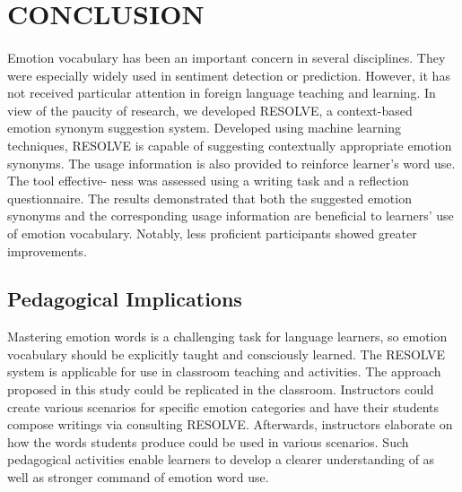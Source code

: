 \documentclass[a4paper,12pt,oneside]{article}
\begin{document}
\newpage
\section{CONCLUSION}
\paragraph{}
Emotion vocabulary has been an important concern in several disciplines. They were especially widely used in sentiment detection or prediction. However, it has not received particular attention in foreign language teaching and learning. In view of the paucity of research, we developed RESOLVE, a context-based emotion synonym suggestion system. Developed using machine learning techniques, RESOLVE is capable of suggesting contextually appropriate emotion synonyms. The usage information is also provided to reinforce learner’s word use. The tool effective- ness was assessed using a writing task and a reflection questionnaire. The results demonstrated that both the suggested emotion synonyms and the corresponding usage information are beneficial to learners’ use of emotion vocabulary. Notably, less proficient participants showed greater improvements.
\subsection{Pedagogical Implications}
Mastering emotion words is a challenging task for language learners, so emotion vocabulary should be explicitly taught and consciously learned. The RESOLVE system is applicable for use in classroom teaching and activities. The approach proposed in this study could be replicated in the classroom. Instructors could create various scenarios for specific emotion categories and have their students compose writings via consulting RESOLVE. Afterwards, instructors elaborate on how the words students produce could be used in various scenarios. Such pedagogical activities enable learners to develop a clearer understanding of as well as stronger command of emotion word use. 
\end{document}
